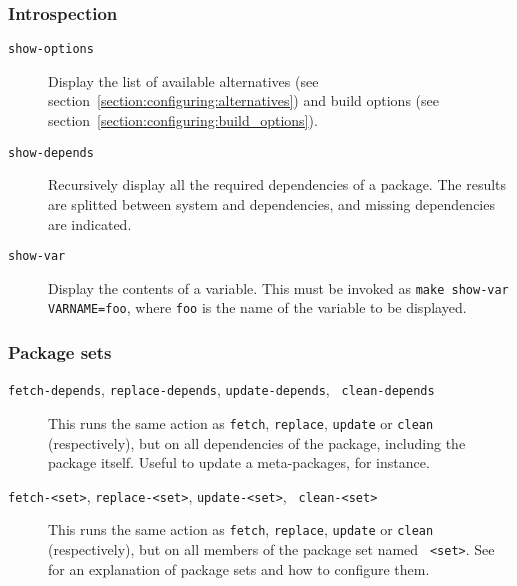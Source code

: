 \subsubsection{Introspection}
\begin{description}
   \item[{\tt show-options}] Display the list of available alternatives (see
   {section~\ref{section:configuring:alternatives}})
   and build options (see
   {section~\ref{section:configuring:build_options}}).

   \item[{\tt show-depends}] Recursively display all the required dependencies
   of a package. The results are splitted between system and \robotpkg
   dependencies, and missing dependencies are indicated.

   \item[{\tt show-var}] Display the contents of a variable. This must be
   invoked as {\tt make show-var VARNAME=foo}, where {\tt foo} is the name of
   the variable to be displayed.
\end{description}

\subsubsection{Package sets}

\begin{description}
   \item[{\tt fetch-depends}, {\tt replace-depends}, {\tt update-depends}, {\tt
   clean-depends}]
   This runs the same action as {\tt fetch}, {\tt replace}, {\tt update} or
   {\tt clean} (respectively), but on all dependencies of the package,
   including the package itself. Useful to update a meta-packages, for instance.

   \item[{\tt fetch-<set>}, {\tt replace-<set>}, {\tt update-<set>}, {\tt
   clean-<set>}]
   This runs the same action as {\tt fetch}, {\tt replace}, {\tt update} or
   {\tt clean} (respectively), but on all members of the package set named {\tt
   <set>}. See
   for an explanation of package sets and how to configure them.

\end{description}
